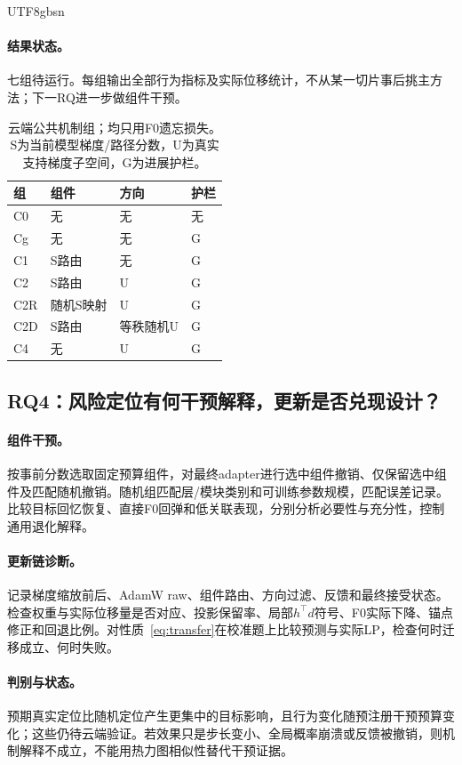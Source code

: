 \documentclass[sigconf,anonymous,review]{acmart}
\begin{document}
\begin{CJK*}{UTF8}{gbsn}
\paragraph{结果状态。}七组待运行。每组输出全部行为指标及实际位移统计，不从某一切片事后挑主方法；下一RQ进一步做组件干预。

\begin{table}[t]
\caption{云端公共机制组；均只用F0遗忘损失。S为当前模型梯度/路径分数，U为真实支持梯度子空间，G为进展护栏。}
\label{tab:ablation}
\centering\small
\begin{tabular}{llll}
\toprule
组 & 组件 & 方向 & 护栏\\
\midrule
C0 & 无 & 无 & 无\\
Cg & 无 & 无 & G\\
C1 & S路由 & 无 & G\\
C2 & S路由 & U & G\\
C2R & 随机S映射 & U & G\\
C2D & S路由 & 等秩随机U & G\\
C4 & 无 & U & G\\
\bottomrule
\end{tabular}
\end{table}

\subsection{RQ4：风险定位有何干预解释，更新是否兑现设计？}
\paragraph{组件干预。}按事前分数选取固定预算组件，对最终adapter进行选中组件撤销、仅保留选中组件及匹配随机撤销。随机组匹配层/模块类别和可训练参数规模，匹配误差记录。比较目标回忆恢复、直接F0回弹和低关联表现，分别分析必要性与充分性，控制通用退化解释。
\paragraph{更新链诊断。}记录梯度缩放前后、AdamW raw、组件路由、方向过滤、反馈和最终接受状态。检查权重与实际位移量是否对应、投影保留率、局部$h^\top d$符号、F0实际下降、锚点修正和回退比例。对性质~\eqref{eq:transfer}在校准题上比较预测与实际LP，检查何时迁移成立、何时失败。
\paragraph{判别与状态。}预期真实定位比随机定位产生更集中的目标影响，且行为变化随预注册干预预算变化；这些仍待云端验证。若效果只是步长变小、全局概率崩溃或反馈被撤销，则机制解释不成立，不能用热力图相似性替代干预证据。


\end{CJK*}
\end{document}
